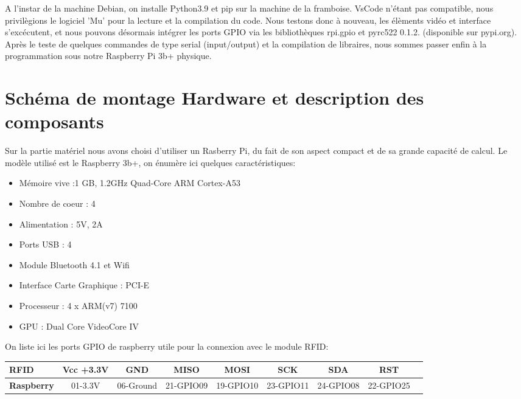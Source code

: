 \documentclass[a4paper]{report}
\begin{document}
    A l'instar de la machine Debian, on installe Python3.9 et pip sur la machine de la framboise.
    VsCode n'étant pas compatible, nous privilègions le logiciel 'Mu' pour la lecture et la 
    compilation du code. Nous testons donc à nouveau, les élèments vidéo et interface s'excécutent,
    et nous pouvons désormais intégrer les ports GPIO via les bibliothèques rpi.gpio
    et pyrc522 0.1.2. (disponible sur pypi.org).
    Après le teste de quelques commandes de type serial (input/output) et la compilation de libraires,
    nous sommes passer enfin à la programmation sous notre Raspberry Pi 3b+ physique.
        
        \section{Schéma de montage Hardware et description des composants}  \label{sec:schema montage}

    Sur la partie matériel nous avons choisi d'utiliser un Rasberry Pi, du fait de son aspect compact et 
    de sa grande capacité de calcul. Le modèle utilisé est le Raspberry 3b+, on énumère ici quelques
    caractéristiques:
        \begin{itemize}
            \item Mémoire vive :1 GB, 1.2GHz Quad-Core ARM Cortex-A53
            \item Nombre de coeur : 4
            \item Alimentation : 5V, 2A
            \item Ports USB : 4
            \item Module Bluetooth 4.1 et Wifi
            \item Interface Carte Graphique : PCI-E
            \item Processeur : 4 x ARM(v7) 7100
            \item GPU : Dual Core VideoCore IV \newline
        \end{itemize}
    On liste ici les ports GPIO de raspberry utile pour la connexion avec le module RFID:\newline
        \begin{tabular}{||p{2cm}||*{8}{c|}|}
            \hline
            \small{RFID} & \small{Vcc +3.3V} & \small{GND} & \small{MISO} 
            & \small{MOSI} & \small{SCK} & \small{SDA} & \small{RST} \\
            \hline
            \bfseries \small{Raspberry} & \small{01-3.3V} & \small{06-Ground} 
            & \small{21-GPIO09} & \small{19-GPIO10} & \small{23-GPIO11} 
            & \small{24-GPIO08} & \small{22-GPIO25} \\
            \hline
            \end{tabular}\newline
            
\end{document}
